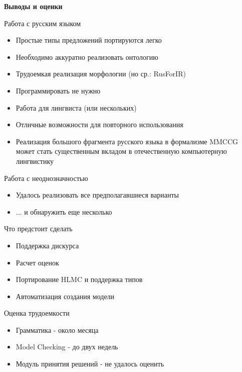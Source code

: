 \documentclass{beamer}
\begin{document}
\begin{frame}{}
\begin{center}
	\textbf{Выводы и оценки}
\end{center}
\end{frame}

\begin{frame}{Работа с русским языком}
\begin{itemize}
	\item Простые типы предложений портируются легко
	\item Необходимо аккуратно реализовать онтологию
	\item Трудоемкая реализация морфологии (но ср.: RusForIR)
	\item Программировать не нужно
	\item Работа для лингвиста (или нескольких)
	\item Отличные возможности для повторного использования
	\item Реализация большого фрагмента русского языка в формализме MMCCG 
может стать существенным вкладом в отечественную компьютерную лингвистику
\end{itemize}
\end{frame}

\begin{frame}{Работа с неоднозначностью}
\begin{itemize}
	\item Удалось реализовать все предполагавшиеся варианты
	\item ... и обнаружить еще несколько
\end{itemize}
\end{frame}

\begin{frame}{Что предстоит сделать}
\begin{itemize}
	\item Поддержка дискурса
	\item Расчет оценок
	\item Портирование HLMC и поддержка типов
	\item Автоматизация создания модели
\end{itemize}
\end{frame}

\begin{frame}{Оценка трудоемкости}
\begin{itemize}
	\item Грамматика - около месяца
	\item Model Checking - до двух недель
	\item Модуль принятия решений - не удалось оценить
\end{itemize}
\end{frame}
\end{document}
